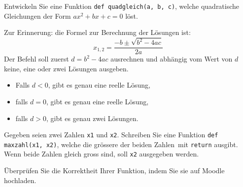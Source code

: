 \begin{myexercise}
	Entwickeln Sie eine Funktion \lstinline|def quadgleich(a, b, c)|, welche quadratische Gleichungen der Form \(ax^2 + bx + c = 0\) löst.

	Zur Erinnerung: die Formel zur Berechnung der Lösungen ist:
	\begin{equation}
		x_{1,2} = \frac{-b \pm \sqrt{b^2 - 4ac}}{2a}
	\end{equation}
	Der Befehl soll zuerst \(d = b^2 - 4ac\) ausrechnen und abhängig vom Wert von $d$ keine, eine oder zwei Lösungen ausgeben.
	\begin{itemize}
		\item Falls $d < 0$, gibt es genau eine reelle Lösung,
		\item falls $d = 0$, gibt es genau eine reelle Lösung,
		\item falls $d > 0$, gibt es genau zwei Lösungen.
	\end{itemize}
	\begin{myanswer}
		
	\end{myanswer}
\end{myexercise}


\begin{mysubmission}
	Gegeben seien zwei Zahlen \lstinline|x1| und \lstinline|x2|. Schreiben Sie eine Funktion \lstinline|def maxzahl(x1, x2)|, welche die grössere der beiden Zahlen mit \lstinline|return| ausgibt. Wenn beide Zahlen gleich gross sind, soll \lstinline|x2| ausgegeben werden.

	Überprüfen Sie die Korrektheit Ihrer Funktion, indem Sie sie auf Moodle hochladen.
	\begin{myanswer}
		
	\end{myanswer}
\end{mysubmission}

